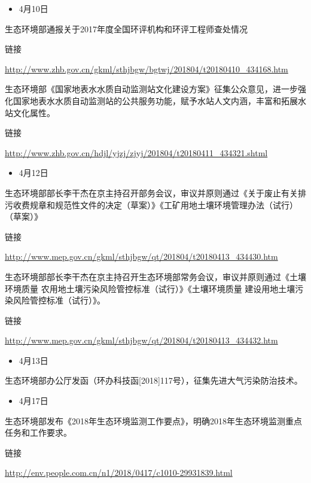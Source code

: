 \documentclass[]{book}
\providecommand{\tightlist}{%
  \setlength{\itemsep}{0pt}\setlength{\parskip}{0pt}}
\begin{document}
\begin{itemize}
\tightlist
\item
  4月10日
\end{itemize}

生态环境部通报关于2017年度全国环评机构和环评工程师查处情况

链接

\url{http://www.zhb.gov.cn/gkml/sthjbgw/bgtwj/201804/t20180410_434168.htm}

生态环境部《国家地表水水质自动监测站文化建设方案》征集公众意见，进一步强化国家地表水水质自动监测站的公共服务功能，赋予水站人文内涵，丰富和拓展水站文化属性。

链接

\url{http://www.zhb.gov.cn/hdjl/yjzj/zjyj/201804/t20180411_434321.shtml}

\begin{itemize}
\tightlist
\item
  4月12日
\end{itemize}

生态环境部部长李干杰在京主持召开部务会议，审议并原则通过《关于废止有关排污收费规章和规范性文件的决定（草案）》《工矿用地土壤环境管理办法（试行）（草案）》

链接

\url{http://www.mep.gov.cn/gkml/sthjbgw/qt/201804/t20180413_434430.htm}

生态环境部部长李干杰在京主持召开生态环境部常务会议，审议并原则通过《土壤环境质量
农用地土壤污染风险管控标准（试行）》《土壤环境质量
建设用地土壤污染风险管控标准（试行）》。

链接

\url{http://www.mep.gov.cn/gkml/sthjbgw/qt/201804/t20180413_434432.htm}

\begin{itemize}
\tightlist
\item
  4月13日
\end{itemize}

生态环境部办公厅发函（环办科技函{[}2018{]}117号），征集先进大气污染防治技术。

\begin{itemize}
\tightlist
\item
  4月17日
\end{itemize}

生态环境部发布《2018年生态环境监测工作要点》，明确2018年生态环境监测重点任务和工作要求。

链接

\url{http://env.people.com.cn/n1/2018/0417/c1010-29931839.html}
\end{document}
